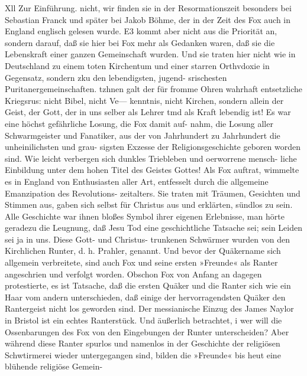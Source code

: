 Xll Zur Einführung.
nicht, wir finden sie in der Resormationszeit besonders bei
Sebastian Franck und später bei Jakob Böhme, der in der
Zeit des Fox auch in England englisch gelesen wurde. E3
kommt aber nicht aus die Priorität an, sondern darauf, daß sie
hier bei Fox mehr als Gedanken waren, daß sie die Lebenskraft
einer ganzen Gemeinschaft wurden. Und sie traten hier nicht wie
in Deutschland zu einem toten Kirchentum und einer starren
Orthvdoxie in Gegensatz, sondern zku den lebendigsten, jugend-
srischesten Puritanergemeinschaften. tzhnen galt der für fromme
Ohren wahrhaft entsetzliche Kriegsrus: nicht Bibel, nicht Ve—
kenntnis, nicht Kirchen, sondern allein der Geist, der Gott, der in
uns selber als Lehrer tmd als Kraft lebendig ist!
Es war eine höchst gefährliche Losung, die Fox damit auf-
nahm, die Losung aller Schwarmgeister und Fanatiker, aus der
von Jahrhundert zu Jahrhundert die unheinilichsten und grau-
sigsten Exzesse der Religionsgeschichte geboren worden sind. Wie
leicht verbergen sich dunkles Triebleben und oerworrene mensch-
liche Einbildung unter dem hohen Titel des Geistes Gottes! Als
Fox auftrat, wimmelte es in England von Enthusiasten aller
Art, entfesselt durch die allgemeine Emanzipation des Revolutions-
zeitalters. Sie traten mit Träumen, Gesichten und Stimmen aus,
gaben sich selbst für Christus aus und erklärten, sündlos zu sein.
Alle Geschichte war ihnen bloßes Symbol ihrer eigenen Erlebnisse,
man hörte geradezu die Leugnung, daß Jesu Tod eine geschichtliche
Tatsache sei; sein Leiden sei ja in uns. Diese Gott- und Christus-
trunkenen Schwärmer wurden von den Kirchlichen Runter,
d. h. Prahler, genannt. Und bevor der Quäkername sich allgemein
verbreitete, sind auch Fox und seine ersten »Freunde« als Ranter
angeschrien und verfolgt worden. Obschon Fox von Anfang an
dagegen protestierte, es ist Tatsache, daß die ersten Quäker und
die Ranter sich wie ein Haar vom andern unterschieden, daß
einige der hervorragendsten Quäker den Rantergeist nicht los
geworden sind. Der messianische Einzug des James Naylor
in Bristol ist ein echtes Ranterstück. Und äußerlich betrachtet, i
wer will die Ossenbarungen des Fox von den Eingebungen der
Runter unterscheiden?
Aber während diese Ranter spurlos und namenlos in der
Geschichte der religiösen Schwtirmerei wieder untergegangen sind,
bilden die »Freunde« bis heut eine blühende religiöse Gemein-


